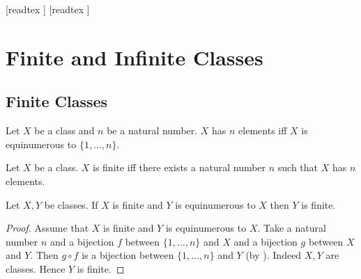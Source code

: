 \documentclass[10pt]{article}
\begin{document}
  \begin{imports}
    \begin{forthel}
      [readtex ]
      [readtex ]
    \end{forthel}
  \end{imports}


  \section*{Finite and Infinite Classes}

  \subsection*{Finite Classes}

  \begin{forthel}
    \begin{definition}
      Let $X$ be a class and $n$ be a natural number.
      $X$ has $n$ elements iff $X$ is equinumerous to $\{ 1, \dots, n \}$.
    \end{definition}
  \end{forthel}

  \begin{forthel}
    \begin{definition}
      Let $X$ be a class.
      $X$ is finite iff there exists a natural number $n$ such that $X$ has $n$ elements.
    \end{definition}
  \end{forthel}

  \begin{forthel}
    \begin{proposition}
      Let $X, Y$ be classes.
      If $X$ is finite and $Y$ is equinumerous to $X$ then $Y$ is finite.
    \end{proposition}
    \begin{proof}
      Assume that $X$ is finite and $Y$ is equinumerous to $X$.
      Take a natural number $n$ and a bijection $f$ between $\{ 1, \dots, n \}$ and $X$ and a bijection $g$ between $X$ and $Y$.
      Then $g \circ f$ is a bijection between $\{ 1, \dots, n \}$ and $Y$ (by ).
      Indeed $X, Y$ are classes.
      Hence $Y$ is finite.
    \end{proof}
  \end{forthel}
\end{document}
